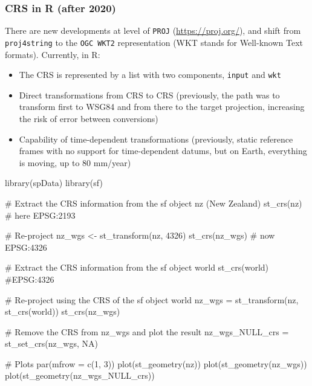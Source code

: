 \documentclass[11pt]{beamer}
\begin{document}
\begin{frame}
\frametitle{CRS in R (after 2020)}
There are new developments at level of \texttt{PROJ} (\url{https://proj.org/}), and shift from \texttt{proj4string} to the \texttt{OGC WKT2} representation (WKT stands for Well-known Text formats). Currently, in R:
\begin{itemize} \setlength\itemsep{\fill}
\item The CRS is represented by a list with two components, \texttt{input} and \texttt{wkt}
\item Direct transformations from CRS to CRS (previously, the path was to transform first to WSG84 and from there to the target projection, increasing the risk of error between conversions)
\item Capability of time-dependent transformations (previously, static reference frames with no support for time-dependent datums, but on Earth, everything is moving, up to 80 mm/year)
\end{itemize}
\end{frame}

\begin{frame}[containsverbatim]
\scriptsize{
\begin{semiverbatim}
library(spData)
library(sf)

# Extract the CRS information from the sf object nz (New Zealand)
st\_crs(nz) # here EPSG:2193

# Re-project 
nz_wgs <- st\_transform(nz, 4326) 
st\_crs(nz\_wgs) # now EPSG:4326

# Extract the CRS information from the sf object world
st\_crs(world) #EPSG:4326

# Re-project using the CRS of the sf object world
nz\_wgs = st\_transform(nz, st\_crs(world))
st\_crs(nz\_wgs)

# Remove the CRS from nz_wgs and plot the result
nz\_wgs\_NULL\_crs = st\_set\_crs(nz\_wgs, NA)

# Plots
par(mfrow = c(1, 3))
plot(st\_geometry(nz))
plot(st\_geometry(nz\_wgs))
plot(st\_geometry(nz\_wgs_NULL\_crs))

\end{semiverbatim}
}
\end{frame}
\end{document}
